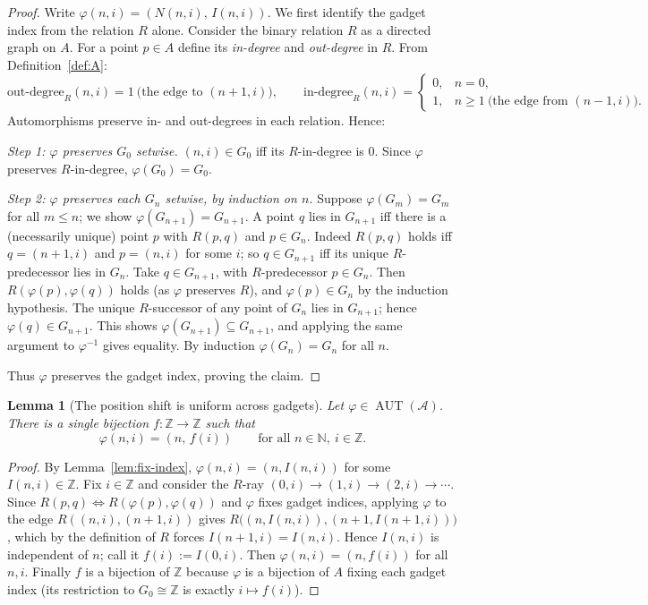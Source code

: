 \documentclass[12pt,fullpage]{article}
\newtheorem{lemma}[theorem]{Lemma}
\theoremstyle{definition}
\newcommand{\A}{\mathcal{A}}
\newcommand{\N}{\mathbb{N}}
\newcommand{\Z}{{\mathbb{Z}}}
\newcommand{\AUT}{\operatorname{AUT}}
\renewcommand{\phi}{\varphi}
\begin{document}
\begin{proof}
Write $\phi(n,i)=(N(n,i),\,I(n,i))$.  We first identify the gadget index from
the relation $R$ alone.  Consider the binary relation $R$ as a directed graph
on $A$.  For a point $p\in A$ define its \emph{in-degree} and
\emph{out-degree} in $R$.  From Definition~\ref{def:A}:
\[
\text{out-degree}_R(n,i)=1\ \text{(the edge to }(n+1,i)),\qquad
\text{in-degree}_R(n,i)=
\begin{cases}
0,& n=0,\\[2pt]
1,& n\ge 1\ \text{(the edge from }(n-1,i)).
\end{cases}
\]
Automorphisms preserve in- and out-degrees in each relation.  Hence:

\smallskip
\noindent\emph{Step 1: $\phi$ preserves $G_0$ setwise.}
$(n,i)\in G_0$ iff its $R$-in-degree is $0$.  Since $\phi$ preserves
$R$-in-degree, $\phi(G_0)=G_0$.

\smallskip
\noindent\emph{Step 2: $\phi$ preserves each $G_n$ setwise, by induction on
$n$.}  Suppose $\phi(G_m)=G_m$ for all $m\le n$; we show $\phi(G_{n+1})=
G_{n+1}$.  A point $q$ lies in $G_{n+1}$ iff there is a (necessarily unique)
point $p$ with $R(p,q)$ and $p\in G_n$.  Indeed $R(p,q)$ holds iff
$q=(n+1,i)$ and $p=(n,i)$ for some $i$; so $q\in G_{n+1}$ iff its unique
$R$-predecessor lies in $G_n$.  Take $q\in G_{n+1}$, with $R$-predecessor
$p\in G_n$.  Then $R(\phi(p),\phi(q))$ holds (as $\phi$ preserves $R$), and
$\phi(p)\in G_n$ by the induction hypothesis.  The unique $R$-successor of any
point of $G_n$ lies in $G_{n+1}$; hence $\phi(q)\in G_{n+1}$.  This shows
$\phi(G_{n+1})\subseteq G_{n+1}$, and applying the same argument to
$\phi^{-1}$ gives equality.  By induction $\phi(G_n)=G_n$ for all $n$.

Thus $\phi$ preserves the gadget index, proving the claim.
\end{proof}

\begin{lemma}[The position shift is uniform across gadgets]\label{lem:uniform}
Let $\phi\in\AUT(\A)$.  There is a single bijection $f\colon\Z\to\Z$ such that
\[
\phi(n,i)=(n,\,f(i))\qquad\text{for all }n\in\N,\ i\in\Z .
\]
\end{lemma}

\begin{proof}
By Lemma~\ref{lem:fix-index}, $\phi(n,i)=(n,I(n,i))$ for some
$I(n,i)\in\Z$.  Fix $i\in\Z$ and consider the $R$-ray
$(0,i)\to(1,i)\to(2,i)\to\cdots$.  Since $R(p,q)\Leftrightarrow
R(\phi(p),\phi(q))$ and $\phi$ fixes gadget indices, applying $\phi$ to the
edge $R((n,i),(n+1,i))$ gives $R\bigl((n,I(n,i)),(n+1,I(n+1,i))\bigr)$, which
by the definition of $R$ forces $I(n+1,i)=I(n,i)$.  Hence $I(n,i)$ is
independent of $n$; call it $f(i):=I(0,i)$.  Then
$\phi(n,i)=(n,f(i))$ for all $n,i$.  Finally $f$ is a bijection of $\Z$
because $\phi$ is a bijection of $A$ fixing each gadget index (its restriction
to $G_0\cong\Z$ is exactly $i\mapsto f(i)$).
\end{proof}
\end{document}
